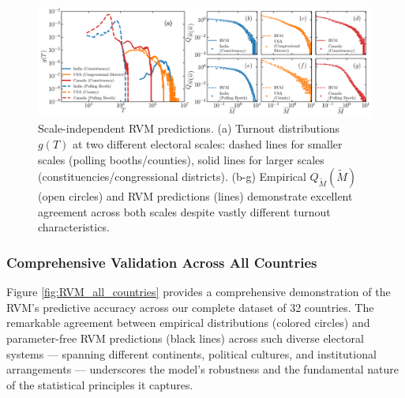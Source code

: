 \begin{figure}[H]
    \centering
    \includegraphics[width=\textwidth]{chapters/chapter5/turnout_margin_empirical_simulation_distribution_diff_scale.pdf}
    \caption{Scale-independent RVM predictions. (a) Turnout distributions $g(T)$ at two different electoral scales: dashed lines for smaller scales (polling booths/counties), solid lines for larger scales (constituencies/congressional districts). (b-g) Empirical $Q_{\widetilde{M}}(\widetilde{M})$ (open circles) and RVM predictions (lines) demonstrate excellent agreement across both scales despite vastly different turnout characteristics.}
    \label{fig:RVM_scale_predictions}
\end{figure}

\subsubsection{Comprehensive Validation Across All Countries}
Figure \ref{fig:RVM_all_countries} provides a comprehensive demonstration of the RVM's predictive accuracy across our complete dataset of 32 countries. The remarkable agreement between empirical distributions (colored circles) and parameter-free RVM predictions (black lines) across such diverse electoral systems — spanning different continents, political cultures, and institutional arrangements — underscores the model's robustness and the fundamental nature of the statistical principles it captures.

